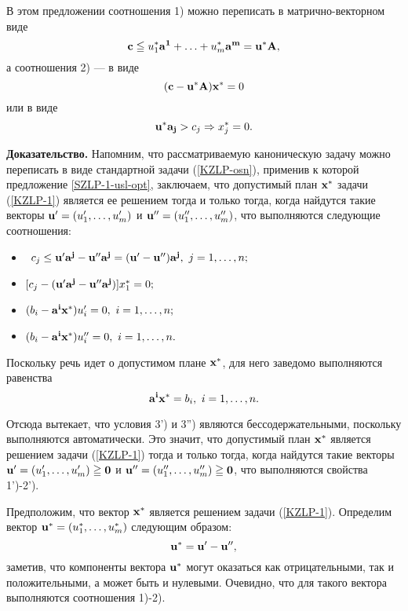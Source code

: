     В этом предложении соотношения 1) можно переписать в
    матрично-векторном виде
    \[\mathbf{c}\leqq u_{1}^{*}\mathbf{a^{1}}+\ldots+u_{m}^{*}\mathbf{a^{m}} =\mathbf{u}^{*}\mathbf{A},\]
    а соотношения 2) --- в виде
    \[(\mathbf{c}-\mathbf{u}^{*}\mathbf{A})\mathbf{x}^{*}=0\]
    или  в виде
    \[\mathbf{u}^{*}\mathbf{a_{j}}>c_{j}\Rightarrow x_{j}^{*}=0.\]

        \textbf{Доказательство.} Напомним, что рассматриваемую каноническую
     задачу можно переписать в виде стандартной задачи
     (\ref{KZLP-osn}), применив к которой предложение
     \ref{SZLP-1-usl-opt}, заключаем, что допустимый план
     $\mathbf{x}^{*}$ задачи
    (\ref{KZLP-1}) является  ее решением
    тогда и только тогда, когда найдутся такие векторы
    $\mathbf{u'}=(u'_{1},\ldots,u'_{m})$ и $\mathbf{u''}=(u''_{1},\ldots,u''_{m})$,
    что выполняются следующие соотношения:
\begin{itemize}
    \item [1')\ ] \
    $c_{j}\leq\mathbf{u'}\mathbf{a^{j}}-\mathbf{u''}\mathbf{a^{j}}=(\mathbf{u'}-\mathbf{u''})\mathbf{a^{j}}, \
    j=1,\ldots,n;$
    \item [2')\ ]
    $[c_{j}-(\mathbf{u'}\mathbf{a^{j}}-\mathbf{u''}\mathbf{a^{j}})]x_{1}^{*}=0;$

    \item [3')\ ]
    $(b_{i}-\vc{a^{i}}\vc{x^{*}})u'_{i}=0,  \ i=1,\ldots,n;$
    \item [3'')\ ]
    $(b_{i}-\vc{a^{i}}\vc{x^{*}})u''_{i}=0,  \ i=1,\ldots,n.$
\end{itemize}
    Поскольку речь идет о допустимом плане
    $\mathbf{x}^{*}$, для него заведомо
    выполняются равенства
    \[\vc{a^{i}}\vc{x^{*}} = b_{i}, \ i=1,\ldots,n.\]

    Отсюда вытекает, что условия 3') и 3'') являются бессодержательными,
    поскольку выполняются автоматически. Это значит, что допустимый план
     $\mathbf{x}^{*}$ является  решением задачи (\ref{KZLP-1})
    тогда и только тогда, когда найдутся такие векторы
    $\mathbf{u'}=(u'_{1},\ldots,u'_{m})\geqq\mathbf{0}$ и
    $\mathbf{u''}=(u''_{1},\ldots,u''_{m})\geqq\mathbf{0}$,
    что выполняются свойства 1')-2').

    Предположим, что вектор $\mathbf{x}^{*}$ является решением задачи
    (\ref{KZLP-1}). Определим вектор $\mathbf{u}^{*}=(u_{1}^{*},\ldots,u_{m}^{*})$
    следующим образом:
    \[\mathbf{u}^{*}=\mathbf{u'}-\mathbf{u''},\]
    заметив, что компоненты вектора $\mathbf{u}^{*}$ могут
    оказаться как отрицательными, так и положительными, а может
    быть и нулевыми. Очевидно, что для такого вектора выполняются соотношения 1)-2).

